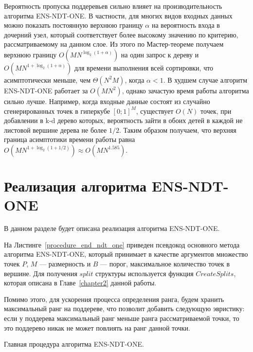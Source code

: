 Вероятность пропуска поддеревьев сильно влияет на производительность алгоритма ENS-NDT-ONE. В частности, для многих видов входных данных можно показать постоянную верхнюю границу $\alpha$ на вероятность входа в дочерний узел, который соответствует более высокому значению по критерию, рассматриваемому на данном слое. Из этого по Мастер-теореме получаем верхнюю границу $O(MN^{\log_2(1+\alpha)})$ на один запрос к дереву и $O(MN^{1+\log_2(1+\alpha)})$ для времени выполнения всей сортировки, что асимптотически меньше, чем $\Theta(N^2M)$, когда $\alpha<1$. В худшем случае алгоритм ENS-NDT-ONE работает за $O(MN^2)$, однако зачастую время работы алгоритма сильно лучше. Например, когда входные данные состоят из случайно сгенерированных точек в гиперкубе $[0; 1]^M$, существует $O(N)$ точек, при добавлении в k-d дерево которых, вероятность зайти в обоих детей в каждой не листовой вершине дерева не более $1/2$. Таким образом получаем, что верхняя граница асимптотики времени работы равна $O(MN^{1+\log_2(1+1/2)}) \approx O(MN^{1.585})$.

\section{Реализация алгоритма ENS-NDT-ONE}

В данном разделе будет описана реализация алгоритма ENS-NDT-ONE. 

На Листинге~\ref{procedure_end_ndt_one} приведен псевдокод основного метода алгоритма ENS-NDT-ONE, который принимает в качестве аргументов множество точек $P$, $M$ {---} размерность и $B$ {---} порог, максимальное количество точек в вершине. Для получения $split$ структуры используется функция $CreateSplits$, которая описана в Главе~\ref{chapter2} данной работы.

Помимо этого, для ускорения процесса определения ранга, будем хранить максимальный ранг на поддереве, что позволит добавить следующую эвристику: если у поддерева максимальный ранг меньше ранга рассматриваемой точки, то это поддерево никак не может повлиять на ранг данной точки. 

\begin{algorithm}
\begin{algorithmic}[1]
        \EndIf
    \EndFor
\EndProcedure
\end{algorithmic}
\caption{Главная процедура алгоритма ENS-NDT-ONE.}
\label{procedure_end_ndt_one}
\end{algorithm}

